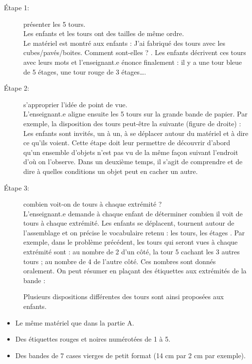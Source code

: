 \begin{exercice*}
\begin{description}
   \item[Étape 1:] présenter les 5 tours. \\
   Les enfants et les tours ont des tailles de même ordre. \\
   Le matériel est montré aux enfants : \og J’ai fabriqué des tours avec les cubes/pavés/boites. Comment sont-elles ? \fg. Les enfants décrivent ces tours avec leurs mots et l’enseignant.e énonce finalement : \og il y a une tour bleue de 5 étages, une tour rouge de 3 étages\dots \fg.
   \item[Étape 2:] s’approprier l’idée de point de vue. \\
   L’enseignant.e aligne ensuite les 5 tours sur la grande bande de papier. Par exemple, la disposition des tours peut-être la suivante (figure de droite) :  \\
   Les enfants sont invités, un à un, à se déplacer autour du matériel et à dire ce qu’ils voient. Cette étape doit leur permettre de découvrir d'abord qu’un ensemble d’objets n’est pas vu de la même façon suivant l’endroit d'où on l'observe. Dans un deuxième temps, il s’agit de comprendre et de dire à quelles conditions un objet peut en cacher un autre.
   \item[Étape 3:] combien voit-on de tours à chaque extrémité ? \\
   L'enseignant.e demande à chaque enfant de déterminer combien il voit de tours à chaque extrémité. Les enfants se déplacent, tournent autour de l'assemblage et on précise le vocabulaire retenu : \og les tours, les étages \fg. Par exemple, dans le problème précédent, les tours qui seront vues à chaque extrémité sont : au nombre de 2 d'un côté, la tour 5 cachant les 3 autres tours ; au nombre de 4 de l'autre côté. Ces nombres sont donnés oralement. On peut résumer en plaçant des étiquettes aux extrémités de la bande :
   \begin{center}
   \end{center}
Plusieurs dispositions différentes des tours sont ainsi proposées aux enfants.
\end{description}


\begin{itemize}
   \item Le même matériel que dans la partie A.
   \item Des étiquettes rouges et noires numérotées de 1 à 5.
   \item Des bandes de 7 cases vierges de petit format (14 cm par 2 cm par exemple). \smallskip
\end{itemize}


\end{exercice*}
